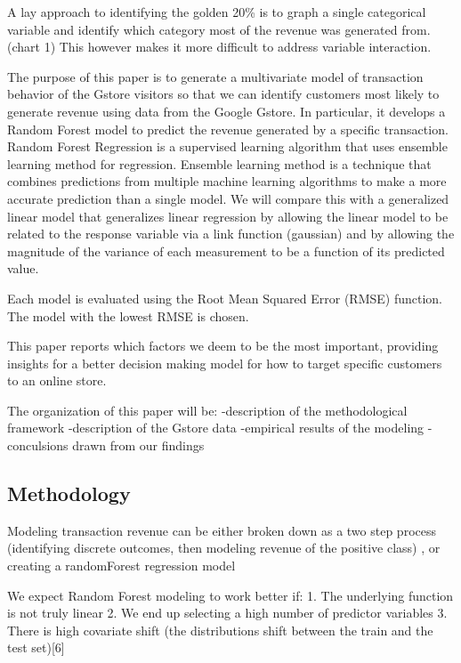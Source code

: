 \documentclass[]{tufte-handout}
\begin{document}
A lay approach to identifying the golden 20\% is to graph a single
categorical variable and identify which category most of the revenue was
generated from. (chart 1) This however makes it more difficult to
address variable interaction.

The purpose of this paper is to generate a multivariate model of
transaction behavior of the Gstore visitors so that we can identify
customers most likely to generate revenue using data from the Google
Gstore. In particular, it develops a Random Forest model to predict the
revenue generated by a specific transaction. Random Forest Regression is
a supervised learning algorithm that uses ensemble learning method for
regression. Ensemble learning method is a technique that combines
predictions from multiple machine learning algorithms to make a more
accurate prediction than a single model. We will compare this with a
generalized linear model that generalizes linear regression by allowing
the linear model to be related to the response variable via a link
function (gaussian) and by allowing the magnitude of the variance of
each measurement to be a function of its predicted value.

Each model is evaluated using the Root Mean Squared Error (RMSE)
function. The model with the lowest RMSE is chosen.

This paper reports which factors we deem to be the most important,
providing insights for a better decision making model for how to target
specific customers to an online store.

The organization of this paper will be: -description of the
methodological framework -description of the Gstore data -empirical
results of the modeling -conculsions drawn from our findings

\hypertarget{methodology}{%
\subsection{Methodology}\label{methodology}}

Modeling transaction revenue can be either broken down as a two step
process (identifying discrete outcomes, then modeling revenue of the
positive class) , or creating a randomForest regression model

We expect Random Forest modeling to work better if: 1. The underlying
function is not truly linear 2. We end up selecting a high number of
predictor variables 3. There is high covariate shift (the distributions
shift between the train and the test set){[}6{]}
\end{document}
